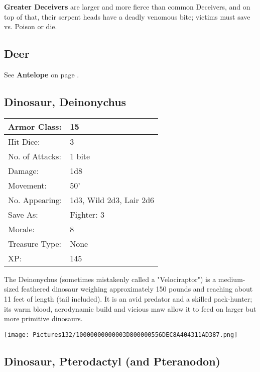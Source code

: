 \documentclass[a4paper,twoside,openany,10pt]{book}
\begin{document}
\begin{multicols}{2}
\textbf{Greater Deceivers} are larger and more fierce than common Deceivers,
and on top of that, their serpent heads have a deadly venomous bite;
victims must save vs. Poison or die.

\subsection*{Deer}\label{deer}

See \textbf{Antelope} on page \hyperlink{antelope}{\pageref{antelope}}.

\subsection*{Dinosaur, Deinonychus}\label{dinosaur-deinonychus}

\begin{tabularx}{0.48\textwidth}{@{}lX@{}}
Armor Class: & 15 \\\hline
Hit Dice: & 3 \\\hline
No. of Attacks: & 1 bite \\\hline
Damage: & 1d8 \\\hline
Movement: & 50' \\\hline
No. Appearing: & 1d3, Wild 2d3, Lair 2d6 \\\hline
Save As: & Fighter: 3 \\\hline
Morale: & 8 \\\hline
Treasure Type: & None \\\hline
XP: & 145 \\\hline
\end{tabularx}\medskip

The Deinonychus (sometimes mistakenly called a "Velociraptor") is a medium-sized feathered dinosaur weighing approximately 150 pounds and reaching about 11 feet of length (tail included). It is an avid predator and a skilled pack-hunter; its warm blood, aerodynamic build and vicious maw allow it to feed on larger but more primitive dinosaurs.

\begin{center}
	\texttt{[image: Pictures132/10000000000003D800000556DEC8A404311AD387.png]}
\end{center}

\subsection*{Dinosaur, Pterodactyl (and Pteranodon)}\label{dinosaur-pterodactyl-and-pteranodon}


\end{multicols}
\end{document}
